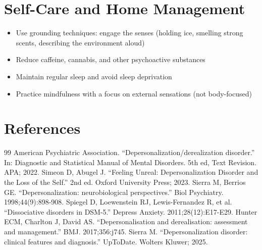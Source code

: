 \section*{Self-Care and Home Management}
\begin{itemize}
  \item Use grounding techniques: engage the senses (holding ice, smelling strong scents, describing the environment aloud)
  \item Reduce caffeine, cannabis, and other psychoactive substances
  \item Maintain regular sleep and avoid sleep deprivation
  \item Practice mindfulness with a focus on external sensations (not body-focused)
\end{itemize}

\section*{References}
\begin{thebibliography}{99}
 American Psychiatric Association. ``Depersonalization/derealization disorder.'' In: Diagnostic and Statistical Manual of Mental Disorders. 5th ed, Text Revision. APA; 2022.
 Simeon D, Abugel J. ``Feeling Unreal: Depersonalization Disorder and the Loss of the Self.'' 2nd ed. Oxford University Press; 2023.
 Sierra M, Berrios GE. ``Depersonalization: neurobiological perspectives.'' Biol Psychiatry. 1998;44(9):898-908.
 Spiegel D, Loewenstein RJ, Lewis-Fernandez R, et al. ``Dissociative disorders in DSM-5.'' Depress Anxiety. 2011;28(12):E17-E29.
 Hunter ECM, Charlton J, David AS. ``Depersonalisation and derealisation: assessment and management.'' BMJ. 2017;356:j745.
 Sierra M. ``Depersonalization disorder: clinical features and diagnosis.'' UpToDate. Wolters Kluwer; 2025.
\end{thebibliography}

